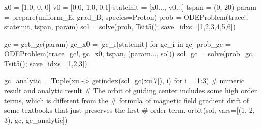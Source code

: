 \documentclass[
  a4paper,
  DIV=11]{scrreprt}
\newenvironment{Shaded}{\begin{snugshade}}{\end{snugshade}}
\newcommand{\CommentTok}[1]{\textcolor[rgb]{0.37,0.37,0.37}{#1}}
\newcommand{\ControlFlowTok}[1]{\textcolor[rgb]{0.00,0.23,0.31}{#1}}
\newcommand{\FloatTok}[1]{\textcolor[rgb]{0.68,0.00,0.00}{#1}}
\newcommand{\FunctionTok}[1]{\textcolor[rgb]{0.28,0.35,0.67}{#1}}
\newcommand{\KeywordTok}[1]{\textcolor[rgb]{0.00,0.23,0.31}{#1}}
\newcommand{\NormalTok}[1]{\textcolor[rgb]{0.00,0.23,0.31}{#1}}
\newcommand{\OperatorTok}[1]{\textcolor[rgb]{0.37,0.37,0.37}{#1}}
\begin{document}
\begin{Shaded}
\begin{Highlighting}[]
\NormalTok{x0 }\OperatorTok{=}\NormalTok{ [}\FloatTok{1.0}\NormalTok{, }\FloatTok{0}\NormalTok{, }\FloatTok{0}\NormalTok{]}
\NormalTok{v0 }\OperatorTok{=}\NormalTok{ [}\FloatTok{0.0}\NormalTok{, }\FloatTok{1.0}\NormalTok{, }\FloatTok{0.1}\NormalTok{]}
\NormalTok{stateinit }\OperatorTok{=}\NormalTok{ [x0}\OperatorTok{...}\NormalTok{, v0}\OperatorTok{...}\NormalTok{]}
\NormalTok{tspan }\OperatorTok{=}\NormalTok{ (}\FloatTok{0}\NormalTok{, }\FloatTok{20}\NormalTok{)}
\NormalTok{param }\OperatorTok{=} \FunctionTok{prepare}\NormalTok{(uniform\_E, grad\_B, species}\OperatorTok{=}\NormalTok{Proton)}
\NormalTok{prob }\OperatorTok{=} \FunctionTok{ODEProblem}\NormalTok{(trace!, stateinit, tspan, param)}
\NormalTok{sol }\OperatorTok{=} \FunctionTok{solve}\NormalTok{(prob, }\FunctionTok{Tsit5}\NormalTok{(); save\_idxs}\OperatorTok{=}\NormalTok{[}\FloatTok{1}\NormalTok{,}\FloatTok{2}\NormalTok{,}\FloatTok{3}\NormalTok{,}\FloatTok{4}\NormalTok{,}\FloatTok{5}\NormalTok{,}\FloatTok{6}\NormalTok{])}

\NormalTok{gc }\OperatorTok{=} \FunctionTok{get\_gc}\NormalTok{(param)}
\NormalTok{gc\_x0 }\OperatorTok{=}\NormalTok{ [}\FunctionTok{gc\_i}\NormalTok{(stateinit) for gc\_i }\KeywordTok{in}\NormalTok{ gc]}
\NormalTok{prob\_gc }\OperatorTok{=} \FunctionTok{ODEProblem}\NormalTok{(trace\_gc!, gc\_x0, tspan, (param}\OperatorTok{...}\NormalTok{, sol))}
\NormalTok{sol\_gc }\OperatorTok{=} \FunctionTok{solve}\NormalTok{(prob\_gc, }\FunctionTok{Tsit5}\NormalTok{(); save\_idxs}\OperatorTok{=}\NormalTok{[}\FloatTok{1}\NormalTok{,}\FloatTok{2}\NormalTok{,}\FloatTok{3}\NormalTok{])}

\NormalTok{gc\_analytic }\OperatorTok{=} \FunctionTok{Tuple}\NormalTok{(xu }\OperatorTok{{-}\textgreater{}} \FunctionTok{getindex}\NormalTok{(}\FunctionTok{sol\_gc}\NormalTok{(xu[}\FloatTok{7}\NormalTok{]), i) }\ControlFlowTok{for}\NormalTok{ i }\OperatorTok{=} \FloatTok{1}\OperatorTok{:}\FloatTok{3}\NormalTok{)}
\CommentTok{\# numeric result and analytic result}
\CommentTok{\# The orbit of guiding center includes some high order terms, which is different from the}
\CommentTok{\# formula of magnetic field gradient drift of some textbooks that just preserves the first}
\CommentTok{\# order term.}
\FunctionTok{orbit}\NormalTok{(sol, vars}\OperatorTok{=}\NormalTok{[(}\FloatTok{1}\NormalTok{, }\FloatTok{2}\NormalTok{, }\FloatTok{3}\NormalTok{), gc, gc\_analytic])}
\end{Highlighting}
\end{Shaded}
\end{document}
